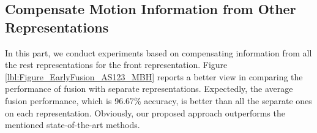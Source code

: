 \documentclass[review]{elsarticle}
\begin{document}
\begin{table}
\begin{center}
		
	\end{center}
	\caption{\label{lbl:AS123ConfusionMatrix}Confusion matrices on three subsets. Notice that action names are identified by indices of actions in table \ref{lbl:20actions}}
\end{table}

\subsection{Compensate Motion Information from Other Representations}
In this part, we conduct experiments based on compensating information from all the rest representations for the front representation. Figure \ref{lbl:Figure_EarlyFusion_AS123_MBH} reports a better view in comparing the performance of fusion with separate representations. Expectedly, the average fusion performance, which is 96.67\% accuracy, is better than all the separate ones on each representation. Obviously, our proposed approach outperforms the mentioned state-of-the-art methods.
 
\end{document}
